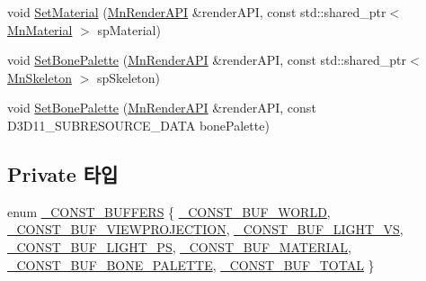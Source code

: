 \begin{DoxyCompactItemize}
\item 
void \hyperlink{class_m_n_l_1_1_mn_skinned_mesh_renderer_a19733cdda9d641852988b00351b3edcf}{Set\+Material} (\hyperlink{class_m_n_l_1_1_mn_render_a_p_i}{Mn\+Render\+A\+PI} \&render\+A\+PI, const std\+::shared\+\_\+ptr$<$ \hyperlink{class_m_n_l_1_1_mn_material}{Mn\+Material} $>$ sp\+Material)
\item 
void \hyperlink{class_m_n_l_1_1_mn_skinned_mesh_renderer_a1c1c02fb793061ca3bb23b00f3c9f4e3}{Set\+Bone\+Palette} (\hyperlink{class_m_n_l_1_1_mn_render_a_p_i}{Mn\+Render\+A\+PI} \&render\+A\+PI, const std\+::shared\+\_\+ptr$<$ \hyperlink{class_m_n_l_1_1_mn_skeleton}{Mn\+Skeleton} $>$ sp\+Skeleton)
\item 
void \hyperlink{class_m_n_l_1_1_mn_skinned_mesh_renderer_aca8b64e27a78b22b8550f46baa39df6a}{Set\+Bone\+Palette} (\hyperlink{class_m_n_l_1_1_mn_render_a_p_i}{Mn\+Render\+A\+PI} \&render\+A\+PI, const D3\+D11\+\_\+\+S\+U\+B\+R\+E\+S\+O\+U\+R\+C\+E\+\_\+\+D\+A\+TA bone\+Palette)
\end{DoxyCompactItemize}
\subsection*{Private 타입}
\begin{DoxyCompactItemize}
\item 
enum \hyperlink{class_m_n_l_1_1_mn_skinned_mesh_renderer_a96362d1653da8abc5659fd4e59a7e34e}{\+\_\+\+C\+O\+N\+S\+T\+\_\+\+B\+U\+F\+F\+E\+RS} \{ \newline
\hyperlink{class_m_n_l_1_1_mn_skinned_mesh_renderer_a96362d1653da8abc5659fd4e59a7e34ea9e7a904a1b3baa4d0e236ce4f61f0b8e}{\+\_\+\+C\+O\+N\+S\+T\+\_\+\+B\+U\+F\+\_\+\+W\+O\+R\+LD}, 
\hyperlink{class_m_n_l_1_1_mn_skinned_mesh_renderer_a96362d1653da8abc5659fd4e59a7e34ea1670028c0fcf07f5c171f5d750fd416a}{\+\_\+\+C\+O\+N\+S\+T\+\_\+\+B\+U\+F\+\_\+\+V\+I\+E\+W\+P\+R\+O\+J\+E\+C\+T\+I\+ON}, 
\hyperlink{class_m_n_l_1_1_mn_skinned_mesh_renderer_a96362d1653da8abc5659fd4e59a7e34ea77fe2e3404d8f312f552cc21c2a8fce2}{\+\_\+\+C\+O\+N\+S\+T\+\_\+\+B\+U\+F\+\_\+\+L\+I\+G\+H\+T\+\_\+\+VS}, 
\hyperlink{class_m_n_l_1_1_mn_skinned_mesh_renderer_a96362d1653da8abc5659fd4e59a7e34eaaf7b497bfcd3a27a2032ee17eb815812}{\+\_\+\+C\+O\+N\+S\+T\+\_\+\+B\+U\+F\+\_\+\+L\+I\+G\+H\+T\+\_\+\+PS}, 
\newline
\hyperlink{class_m_n_l_1_1_mn_skinned_mesh_renderer_a96362d1653da8abc5659fd4e59a7e34ea1f8685259a510f17a92934711f9561d5}{\+\_\+\+C\+O\+N\+S\+T\+\_\+\+B\+U\+F\+\_\+\+M\+A\+T\+E\+R\+I\+AL}, 
\hyperlink{class_m_n_l_1_1_mn_skinned_mesh_renderer_a96362d1653da8abc5659fd4e59a7e34eaec4bfb4f5ed40ee84f9185732a3ee3db}{\+\_\+\+C\+O\+N\+S\+T\+\_\+\+B\+U\+F\+\_\+\+B\+O\+N\+E\+\_\+\+P\+A\+L\+E\+T\+TE}, 
\hyperlink{class_m_n_l_1_1_mn_skinned_mesh_renderer_a96362d1653da8abc5659fd4e59a7e34ea51dc834d756f0b38d40ab3f05e4937c1}{\+\_\+\+C\+O\+N\+S\+T\+\_\+\+B\+U\+F\+\_\+\+T\+O\+T\+AL}
 \}
\end{DoxyCompactItemize}
